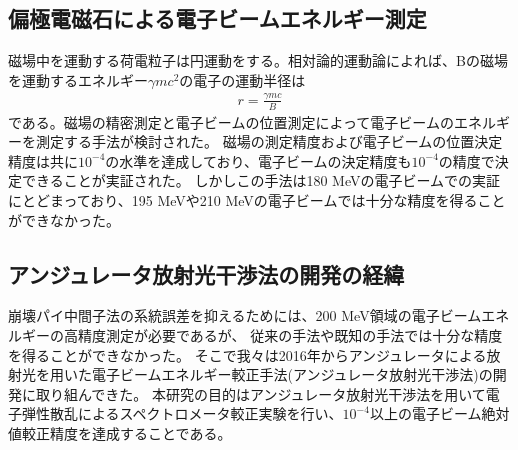 \documentclass[a4paper,11pt,uplatex]{jsbook}
\begin{document}
\subsection{偏極電磁石による電子ビームエネルギー測定}
磁場中を運動する荷電粒子は円運動をする。相対論的運動論によれば、Bの磁場を運動するエネルギー$\gamma mc^2$の電子の運動半径は
\begin{eqnarray}
  r = \frac{\gamma mc}{B}
\end{eqnarray}
である。磁場の精密測定と電子ビームの位置測定によって電子ビームのエネルギーを測定する手法が検討された。
磁場の測定精度および電子ビームの位置決定精度は共に$10^{-4}$の水準を達成しており、電子ビームの決定精度も$10^{-4}$の精度で決定できることが実証された。
しかしこの手法は180 MeVの電子ビームでの実証にとどまっており、195 MeVや210 MeVの電子ビームでは十分な精度を得ることができなかった\cite{herrmann}。
\subsection{アンジュレータ放射光干渉法の開発の経緯}
崩壊パイ中間子法の系統誤差を抑えるためには、200 MeV領域の電子ビームエネルギーの高精度測定が必要であるが、
従来の手法や既知の手法では十分な精度を得ることができなかった。
そこで我々は2016年からアンジュレータによる放射光を用いた電子ビームエネルギー較正手法(アンジュレータ放射光干渉法)の開発に取り組んできた\cite{klag2018,klag2023}。
本研究の目的はアンジュレータ放射光干渉法を用いて電子弾性散乱によるスペクトロメータ較正実験を行い、$10^{-4}$以上の電子ビーム絶対値較正精度を達成することである。
\end{document}
